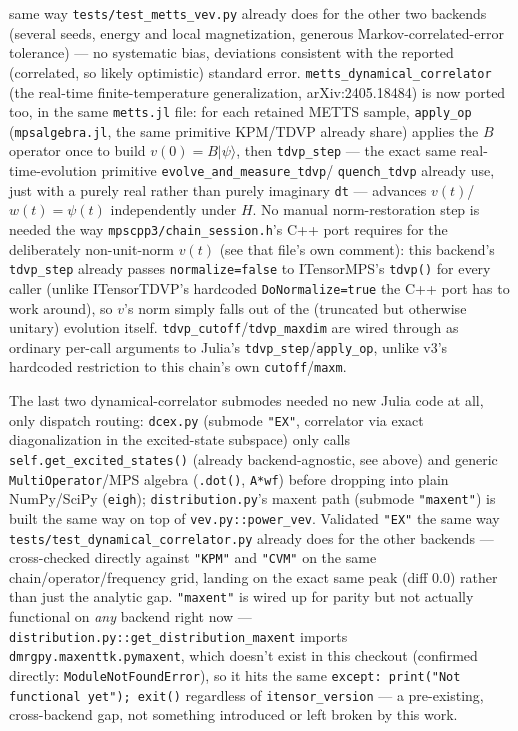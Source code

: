 \documentclass[11pt]{article}
\begin{document}
same way \texttt{tests/test\_metts\_vev.py} already does for the other
two backends (several seeds, energy and local magnetization, generous
Markov-correlated-error tolerance) --- no systematic bias, deviations
consistent with the reported (correlated, so likely optimistic) standard
error. \texttt{metts\_dynamical\_correlator} (the real-time
finite-temperature generalization, arXiv:2405.18484) is now ported too,
in the same \texttt{metts.jl} file: for each retained METTS sample,
\texttt{apply\_op} (\texttt{mpsalgebra.jl}, the same primitive KPM/TDVP
already share) applies the $B$ operator once to build
$v(0)=B|\psi\rangle$, then \texttt{tdvp\_step} --- the exact same
real-time-evolution primitive \texttt{evolve\_and\_measure\_tdvp}/
\texttt{quench\_tdvp} already use, just with a purely real rather than
purely imaginary \texttt{dt} --- advances $v(t)$/$w(t)=\psi(t)$
independently under $H$. No manual norm-restoration step is needed the
way \texttt{mpscpp3/chain\_session.h}'s C++ port requires for the
deliberately non-unit-norm $v(t)$ (see that file's own comment): this
backend's \texttt{tdvp\_step} already passes \texttt{normalize=false} to
ITensorMPS's \texttt{tdvp()} for every caller (unlike ITensorTDVP's
hardcoded \texttt{DoNormalize=true} the C++ port has to work around), so
$v$'s norm simply falls out of the (truncated but otherwise unitary)
evolution itself. \texttt{tdvp\_cutoff}/\texttt{tdvp\_maxdim} are wired
through as ordinary per-call arguments to Julia's
\texttt{tdvp\_step}/\texttt{apply\_op}, unlike v3's hardcoded restriction
to this chain's own \texttt{cutoff}/\texttt{maxm}.

The last two dynamical-correlator submodes needed no new Julia code at
all, only dispatch routing: \texttt{dcex.py} (submode \texttt{"EX"},
correlator via exact diagonalization in the excited-state subspace) only
calls \texttt{self.get\_excited\_states()} (already backend-agnostic,
see above) and generic \texttt{MultiOperator}/MPS algebra
(\texttt{.dot()}, \texttt{A*wf}) before dropping into plain NumPy/SciPy
(\texttt{eigh}); \texttt{distribution.py}'s maxent path (submode
\texttt{"maxent"}) is built the same way on top of
\texttt{vev.py::power\_vev}. Validated \texttt{"EX"} the same way
\texttt{tests/test\_dynamical\_correlator.py} already does for the other
backends --- cross-checked directly against \texttt{"KPM"} and
\texttt{"CVM"} on the same chain/operator/frequency grid, landing on the
exact same peak (diff $0.0$) rather than just the analytic gap.
\texttt{"maxent"} is wired up for parity but not actually functional on
\emph{any} backend right now --- \texttt{distribution.py::get\_distribution\_maxent}
imports \texttt{dmrgpy.maxenttk.pymaxent}, which doesn't exist in this
checkout (confirmed directly: \texttt{ModuleNotFoundError}), so it hits
the same \texttt{except: print("Not functional yet"); exit()} regardless
of \texttt{itensor\_version} --- a pre-existing, cross-backend gap, not
something introduced or left broken by this work.
\end{document}
